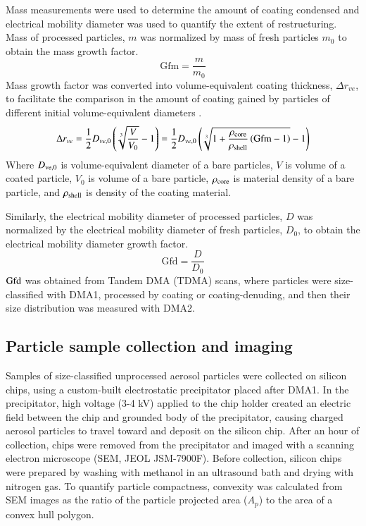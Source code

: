 \documentclass[12pt,authoryear]{elsarticle}
\begin{document}
Mass measurements were used to determine the amount of coating condensed and electrical mobility diameter was used to quantify the extent of restructuring. Mass of processed particles, $m$ was normalized by mass of fresh particles $m_0$ to obtain the mass growth factor.
\begin{equation}
\mathrm{Gfm}=\frac{m}{m_0}
\label{eq:gfm}
\end{equation}
Mass growth factor was converted into volume-equivalent coating thickness, $\Delta r_{ve}$, to facilitate the comparison in the amount of coating gained by particles of different initial volume-equivalent diameters \citep{RN37}.
\begin{equation}
\Delta r_{ve}=\frac{1}{2}D_{ve,0}\left(\sqrt[3]{\frac{V}{V_0}}-1\right)=
\frac{1}{2}D_{ve,0}\left(\sqrt[3]{1+\frac{\rho_{\rm core}}{\rho_{\rm shell}}\left(\mathrm{Gfm}-1\right)}-1\right)
\label{eq:drve}
\end{equation}
Where $D_{\rm ve,0}$ is volume-equivalent diameter of a bare particles, $V$ is volume of a coated particle, $V_0$ is volume of a bare particle, $\rho_{\rm core}$ is material density of a bare particle, and $\rho_{\rm shell}$ is density of the coating material.

Similarly, the electrical mobility diameter of processed particles, $D$ was normalized by the electrical mobility diameter of fresh particles, $D_0$, to obtain the electrical mobility diameter growth factor.
\begin{equation}
\mathrm{Gfd}=\frac{D}{D_0}
\label{eq:gfd}
\end{equation}
$\rm Gfd$ was obtained from Tandem DMA (TDMA) scans, where particles were size-classified with DMA1, processed by coating or coating-denuding, and then their size distribution was measured with DMA2.

\subsection{Particle sample collection and imaging}

Samples of size-classified unprocessed aerosol particles were collected on silicon chips, using a custom-built electrostatic precipitator \citep{RN17,RN16} placed after DMA1. In the precipitator, high voltage (3-4 kV) applied to the chip holder created an electric field between the chip and grounded body of the precipitator, causing charged aerosol particles to travel toward and deposit on the silicon chip. After an hour of collection, chips were removed from the precipitator and imaged with a scanning electron microscope (SEM, JEOL JSM-7900F). Before collection, silicon chips were prepared by washing with methanol in an ultrasound bath and drying with nitrogen gas. To quantify particle compactness, convexity was calculated from SEM images as the ratio of the particle projected area ($A_p$) to the area of a convex hull polygon.
\end{document}
